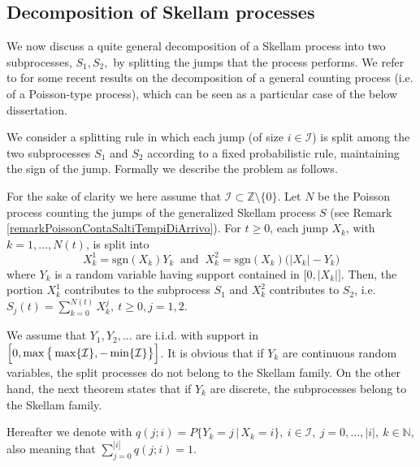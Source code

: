 \documentclass[12pt, twoside, english, headsepline]{article}
\theoremstyle{definition} %
\numberwithin{equation}{section} %
\begin{document}
\subsection{Decomposition of Skellam processes}\label{sezioneDecomposizione}

We now discuss a quite general decomposition of a Skellam process into two subprocesses, $S_1,S_2,$ by splitting the jumps that the process performs. We refer to \cite{DK2024} for some recent results on the decomposition of a general counting process (i.e. of a Poisson-type process), which can be seen as a particular case of the below dissertation.

We consider a splitting rule in which each jump (of size $i\in\mathcal{I}$) is split among the two subprocesses $S_1$ and $S_2$ according to a fixed probabilistic rule, maintaining the sign of the jump. Formally we describe the problem as follows.

For the sake of clarity we here assume that $\mathcal{I}\subset\mathbb{Z}\setminus\{0\}$. Let $N$ be the Poisson process counting the jumps of the generalized Skellam process $S$ (see Remark \ref{remarkPoissonContaSaltiTempiDiArrivo}). For $t\ge0$, each jump $X_k$, with $k = 1,\dots, N(t)$, is split into 
\begin{equation}\label{saltiDecomposizioneSkellam}
	X^1_k = \text{sgn}(X_k)Y_k\ \text{ and } \ X^2_k = \text{sgn}(X_k) \bigl(|X_k| - Y_k\bigr)
\end{equation}
where $Y_k$ is a random variable having support contained in $\bigl[0, |X_k|\bigr]$. Then, the portion $X_k^1$ contributes to the subprocess $S_1$ and $X_k^2$ contributes to $S_2$, i.e. $S_j(t) = \sum_{k=0}^{N(t)} X_k^j,\ t\ge0, j=1,2$. 

We assume that $Y_1,Y_2,\dots$ are i.i.d. with support in $\Bigl[0, \max\big\{\max\{\mathcal{I}\}, -\min\{\mathcal{I}\}\big\}\Bigr]$. It is obvious that if $Y_k$ are continuous random variables, the split processes do not belong to the Skellam family. On the other hand, the next theorem states that if $Y_k$ are discrete, the subprocesses belong to the Skellam family.

Hereafter we denote with $q(j;i) =  P\{Y_k = j \,|\,X_k = i\},\ i\in\mathcal{I}, \ j=0,\dots, |i|, \ k\in\mathbb{N}$, also meaning that $\sum_{j=0}^{|i|} q(j;i)=1$.
\end{document}
